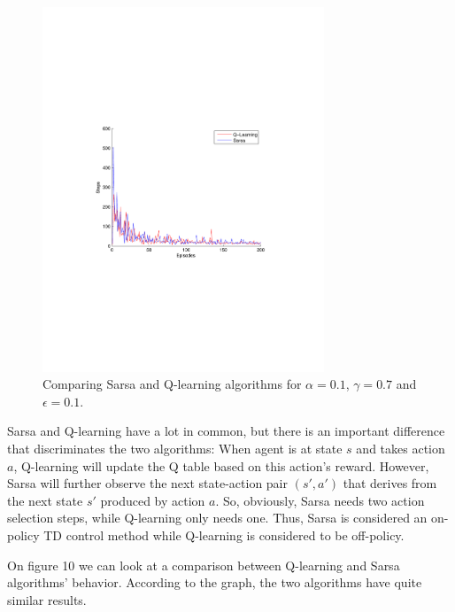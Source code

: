 \documentclass[a4paper,11pt]{article}
\begin{document}
\begin{figure}[t!]
  \centering
    \includegraphics[trim=4cm 8.5cm 4cm 8.5cm,clip,width=0.75\textwidth]{figures/sarsaQcomp01.pdf}
    \caption{Comparing Sarsa and Q-learning algorithms for $\alpha = 0.1$, $\gamma = 0.7$ and $\epsilon = 0.1$.}
\end{figure}

Sarsa and Q-learning have a lot in common, but there is an important difference that discriminates the two algorithms: When agent is at state $s$ and takes action $a$, Q-learning will update the Q table based on this action's reward. However, Sarsa will further observe the next state-action pair $(s',a')$ that derives from the next state $s'$ produced by action $a$. So, obviously, Sarsa needs two action selection steps, while Q-learning only needs one. Thus, Sarsa is considered an on-policy TD control method while Q-learning is considered to be off-policy.

On figure 10 we can look at a comparison between Q-learning and Sarsa algorithms' behavior. According to the graph, the two algorithms have quite similar results.
\end{document}
